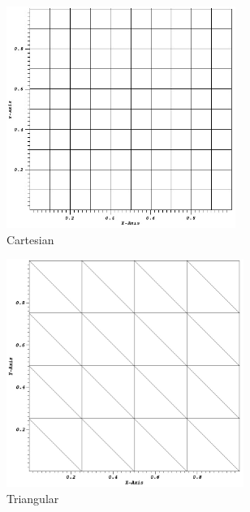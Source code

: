 \begin{figure}
\centering
	\begin{subfigure}[b]{0.5\textwidth}
		\centering
		\includegraphics[width=0.82\textwidth]{figures/sec_DSA/SIP_cart_mesh.png}
		\caption{Cartesian}
	\end{subfigure}
	\vfill
	\begin{subfigure}[b]{0.45\textwidth}
		\centering
		\includegraphics[width=0.85\textwidth]{figures/sec_DSA/SIP_tri_mesh.png}
		\caption{Triangular}
	\end{subfigure}
	\hfill
	\begin{subfigure}[b]{0.45\textwidth}

\end{subfigure}
\end{figure}

